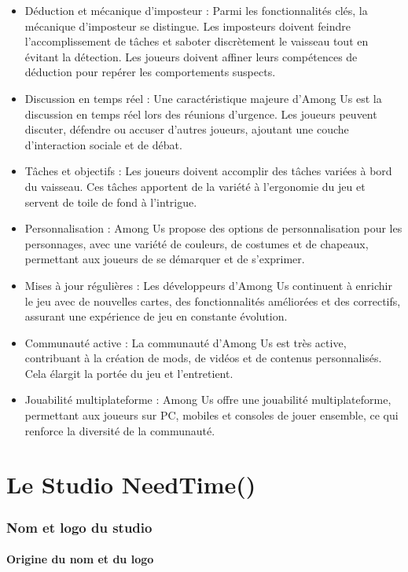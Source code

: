\documentclass[
	article,			%
	11pt,				%
	oneside,			%
	a4paper,			%
	chapter=TITLE,
	french,			%
	sumario=tradicional
	]{base_nt}
\begin{document}
\begin{itemize}
    \item Déduction et mécanique d'imposteur : Parmi les fonctionnalités clés, la mécanique d'imposteur se distingue. Les imposteurs doivent feindre l'accomplissement de tâches et saboter discrètement le vaisseau tout en évitant la détection. Les joueurs doivent affiner leurs compétences de déduction pour repérer les comportements suspects.
    \item Discussion en temps réel : Une caractéristique majeure d'Among Us est la discussion en temps réel lors des réunions d'urgence. Les joueurs peuvent discuter, défendre ou accuser d'autres joueurs, ajoutant une couche d'interaction sociale et de débat.
    \item Tâches et objectifs : Les joueurs doivent accomplir des tâches variées à bord du vaisseau. Ces tâches apportent de la variété à l'ergonomie du jeu et servent de toile de fond à l'intrigue.
    \item Personnalisation : Among Us propose des options de personnalisation pour les personnages, avec une variété de couleurs, de costumes et de chapeaux, permettant aux joueurs de se démarquer et de s'exprimer.
    \item Mises à jour régulières : Les développeurs d'Among Us continuent à enrichir le jeu avec de nouvelles cartes, des fonctionnalités améliorées et des correctifs, assurant une expérience de jeu en constante évolution.
    \item Communauté active : La communauté d'Among Us est très active, contribuant à la création de mods, de vidéos et de contenus personnalisés. Cela élargit la portée du jeu et l'entretient.
    \item Jouabilité multiplateforme : Among Us offre une jouabilité multiplateforme, permettant aux joueurs sur PC, mobiles et consoles de jouer ensemble, ce qui renforce la diversité de la communauté.
\end{itemize}

\part{Le Studio NeedTime()}

\section{Nom et logo du studio}

\subsection{Origine du nom et du logo}
\end{document}
